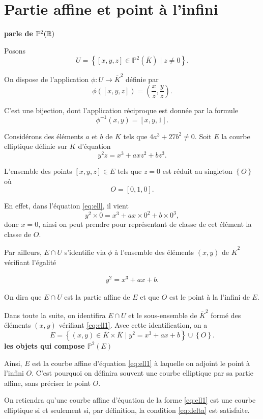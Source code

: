 \section{Partie affine et point à l'infini}

\textbf{parle de $\mathbb{P}^2(\mathbb{R})$}

Posons 
\[
U = \left\{ [x,y,z] \in \mathbb{P}^2(\overline{K}) \mid z \neq 0 \right\} 
.\] 

On dispose de l'application $\phi : U \to \overline{K}^2$ définie par
\[
\phi([x,y,z])=\left( \frac{x}{z},\frac{y}{z} \right) 
.\] 

C'est une bijection, dont l'application réciproque est donnée par la formule
\[
\phi^{-1}(x,y)=\left[ x,y,1 \right] 
.\] 

Considérons des éléments $a$ et $b$ de $K$ tels que $4a^3+27b^2 \neq 0$. Soit $E$ la courbe elliptique définie sur $K$ d'équation 
\[
y^2z=x^3+axz^2+bz^3
.\] 

L'ensemble des points $[x,y,z] \in E$ tels que $z=0$ est réduit au singleton $\left\{ O \right\} $ où
\[
O = [0,1,0]
.\] 

En effet, dans l'équation \eqref{eq:ell}, il vient
\[
y^2\times 0 = x^3 + ax \times 0^2 + b \times 0^3
,\] 
donc $x=0$, ainsi on peut prendre pour représentant de classe de cet élément la classe de $O$.

Par ailleurs, $E \cap U$ s'identifie via $\phi$ à l'ensemble des éléments $(x,y)$ de $\overline{K}^2$ vérifiant l'égalité

\begin{align}
    \label{eq:ell1}
y^2 = x^3 + ax + b
.\end{align}

On dira que $E \cap U$ est la partie affine de $E$ et que $O$ est le point à la l'infini de $E$.

Dans toute la suite, on identifira $E \cap U$ et le sous-ensemble de $\overline{K}^2$ formé des éléments $(x,y)$ vérifiant \eqref{eq:ell1}. Avec cette identification, on a 
\[
E = \left\{ (x,y) \in \overline{K} \times \overline{K} \mid y^2=x^3+ax+b \right\} \cup \left\{ O \right\} 
.\] 
\textbf{les objets qui compose $\mathbb{P}^2(E)$}

Ainsi, $E$ est la courbe affine d'équation \eqref{eq:ell1} à laquelle on adjoint le point à l'infini $O$. C'est pourquoi on définira souvent une courbe elliptique par sa partie affine, sans préciser le point $O$.

\begin{remarque}
    On retiendra qu'une courbe affine d'équation de la forme \eqref{eq:ell1} est une courbe
    elliptique si et seulement si, par définition, la condition \eqref{eq:delta} est satisfaite.
\end{remarque}

